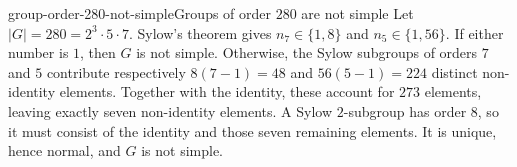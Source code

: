 \documentclass[preview]{standalone}
\begin{document}
\begin{snippetexample}{group-order-280-not-simple}{Groups of order \(280\) are not simple}
    Let \(|G|=280=2^3\cdot5\cdot7\). Sylow's theorem gives
    \(n_7\in\{1,8\}\) and \(n_5\in\{1,56\}\). If either number is \(1\),
    then \(G\) is not simple. Otherwise, the Sylow subgroups of orders \(7\)
    and \(5\) contribute respectively \(8(7-1)=48\) and
    \(56(5-1)=224\) distinct non-identity elements. Together with the
    identity, these account for \(273\) elements, leaving exactly seven
    non-identity elements. A Sylow \(2\)-subgroup has order \(8\), so it must
    consist of the identity and those seven remaining elements. It is unique,
    hence normal, and \(G\) is not simple.
\end{snippetexample}
\end{document}
